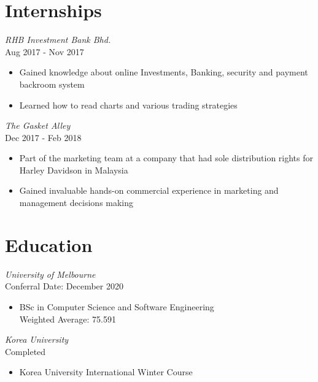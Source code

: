 \documentclass[10pt, a4paper]{cv}
\begin{document}
\begin{paracol}{2}
\begin{flushleft}
		\section*{Internships}
		 {\sl RHB Investment Bank Bhd. } \\
		Aug 2017 - Nov 2017
		\begin{itemize} \itemsep -2pt
			\item Gained knowledge about online Investments, \quad Banking, security and payment backroom system
			\item Learned how to read charts and various trading strategies
		\end{itemize}
		{\sl The Gasket Alley } \\
		Dec 2017 - Feb 2018
		\begin{itemize} \itemsep -2pt
			\item Part of the marketing team at a company that had sole distribution rights for Harley Davidson in Malaysia
			\item  Gained invaluable hands-on commercial experience in marketing and management decisions making
		\end{itemize}

		\switchcolumn

		\section*{Education}
		 {\sl University of Melbourne} \\
		Conferral Date: December 2020
		\begin{itemize} \itemsep -1pt
			\item BSc in Computer Science and Software Engineering \\
			      Weighted Average: 75.591
		\end{itemize}
		{\sl Korea University} \\
		Completed
		\begin{itemize} \itemsep -1pt
			\item Korea University International Winter Course \\
		\end{itemize}


\end{flushleft}
\end{paracol}
\end{document}
